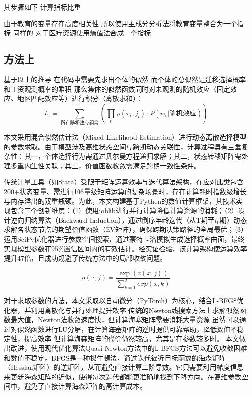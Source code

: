 \documentclass[a4paper,12pt]{article}
\begin{document}
其步骤如下
计算指标比重


由于教育的变量存在高度相关性
所以使用主成分分析法将教育变量整合为一个指标
同样的
对于医疗资源使用熵值法合成一个指标

\subsection{方法上} %
\label{sub:方法上}
基于以上的推导
在代码中需要先求出个体的似然
而个体的总似然是迁移选择概率和工资观测概率的乘积
那么集体的似然函数同时对未观测的随机效应（固定效应、地区匹配效应等）进行积分（离散求和）：
\begin{equation}
  L_{i}=\sum\limits_{\text{所有随机效应组合}}(\prod_{t}\rho(x_{t},j_{t})⋅P(w_{t}|\text{随机效应}))
\end{equation}

本文采用混合似然估计法（Mixed Likelihood Estimation）进行动态离散选择模型的参数求取。由于模型涉及高维状态空间与跨期动态关联性，计算过程具有三重复杂性：其一，个体选择行为需通过贝尔曼方程递归求解；其二，状态转移矩阵需处理多重内生性关联；其三，价值函数收敛需满足跨期一致性条件。

传统计量工具（如Stata）受限于矩阵运算效率与迭代算法架构，在应对此类包含200+状态变量、需进行10\^6量级矩阵运算的复杂场景时，存在计算耗时指数级增长与内存溢出的双重瓶颈。为此，本文构建基于Python的数值计算框架，其技术实现包含三个创新维度：（1）使用joblib进行并行计算降低计算资源的消耗；（2）设计逆向归纳算法（Backward Induction），通过倒序年龄迭代（从T期至$t_0$期）动态求解各状态节点的期望价值函数（EV矩阵），确保跨期决策路径的全局最优；（3）运用SciPy优化器进行参数空间搜索，通过蒙特卡洛模拟生成选择概率曲面，最终实现模型参数在95\%置信区间内的有效估计。经实证检验，该计算架构使运算效率提升47倍，且成功规避了传统方法中的局部收敛问题。

\begin{equation}
  \rho(x,j)=\frac{\exp(v(x,j))}{\sum\limits_{k=1}^{J} exp(x,k)}
\end{equation}

对于求取参数的方法，本文采取以自动微分（PyTorch）为核心，结合L-BFGS优化器，并利用离散化与并行处理提升效率
传统的Newton线搜索方法上求解似然函数最大值，Newton法收敛速度快，但计算海塞矩阵需要消耗大量资源
虽然可以通过对似然函数进行LU分解，在计算海塞矩阵的逆时提供可靠帮助，降低数值不稳定性，提高效率
但计算海森矩阵的代价仍然较高，尤其是在参数较多时。
本文做出改进，使用现代优化算法Quasi-Newton方法中的L-BFGS方法可以避免收敛困难和数值不稳定。BFGS是一种拟牛顿法，通过迭代逼近目标函数的海森矩阵（Hessian矩阵）的逆矩阵，从而避免直接计算二阶导数。它只需要利用梯度信息来更新海森矩阵的近似，使得每次迭代都能更准确地找到下降方向。在高维参数空间中，避免了直接计算海森矩阵的高计算成本。
\end{document}
